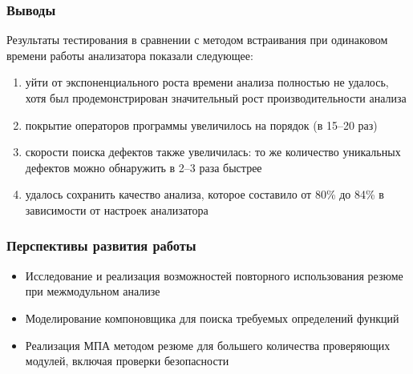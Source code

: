 \documentclass[14pt]{beamer}
\begin{document}
\begin{frame}[allowframebreaks]
\frametitle{Выводы}
Результаты тестирования в сравнении с методом встраивания при одинаковом времени работы анализатора показали следующее:
\begin{enumerate}
  \item уйти от экспоненциального роста времени анализа полностью не удалось, хотя был продемонстрирован значительный рост производительности анализа
  \item покрытие операторов программы увеличилось на порядок (в 15--20 раз)
  \item скорости поиска дефектов также увеличилась: то же количество уникальных дефектов можно обнаружить в 2--3 раза быстрее
  \item удалось сохранить качество анализа, которое составило от 80\% до 84\% в зависимости от настроек анализатора
\end{enumerate}
\end{frame}
\begin{frame}
\frametitle{Перспективы развития работы}
\begin{itemize}
  \item Исследование и реализация возможностей повторного использования резюме при межмодульном анализе
  \item Моделирование компоновщика для поиска требуемых определений функций
  \item Реализация МПА методом резюме для большего количества проверяющих модулей, включая проверки безопасности
\end{itemize}
\end{frame}
\end{document}
